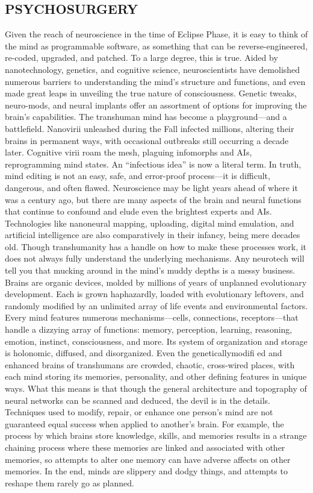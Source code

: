 \subsection{PSYCHOSURGERY}
Given the reach of neuroscience in the time of
Eclipse Phase, it is easy to think of the mind as
programmable software, as something that can be
reverse-engineered, re-coded, upgraded, and patched.
To a large degree, this is true. Aided by nanotechnology,
genetics, and cognitive science, neuroscientists
have demolished numerous barriers to understanding
the mind’s structure and functions, and even
made great leaps in unveiling the true nature of
consciousness. Genetic tweaks, neuro-mods, and
neural implants offer an assortment of options for
improving the brain’s capabilities. The transhuman
mind has become a playground—and a battlefield.
Nanovirii unleashed during the Fall infected millions,
altering their brains in permanent ways, with
occasional outbreaks still occurring a decade later.
Cognitive virii roam the mesh, plaguing infomorphs
and AIs, reprogramming mind states. An “infectious
idea” is now a literal term.
In truth, mind editing is not an easy, safe, and
error-proof process—it is difficult, dangerous, and
often flawed. Neuroscience may be light years
ahead of where it was a century ago, but there are
many aspects of the brain and neural functions
that continue to confound and elude even the
brightest experts and AIs. Technologies like nanoneural
mapping, uploading, digital mind emulation,
and artificial intelligence are also comparatively
in their infancy, being mere decades old. Though
transhumanity has a handle on how to make these
processes work, it does not always fully understand
the underlying mechanisms.
Any neurotech will tell you that mucking around
in the mind’s muddy depths is a messy business.
Brains are organic devices, molded by millions of
years of unplanned evolutionary development. Each
is grown haphazardly, loaded with evolutionary
leftovers, and randomly modified by an unlimited
array of life events and environmental factors. Every
mind features numerous mechanisms—cells, connections,
receptors—that handle a dizzying array
of functions: memory, perception, learning, reasoning,
emotion, instinct, consciousness, and more. Its
system of organization and storage is holonomic,
diffused, and disorganized. Even the geneticallymodifi
ed and enhanced brains of transhumans are
crowded, chaotic, cross-wired places, with each
mind storing its memories, personality, and other
defining features in unique ways.
What this means is that though the general architecture
and topography of neural networks can
be scanned and deduced, the devil is in the details.
Techniques used to modify, repair, or enhance one
person’s mind are not guaranteed equal success
when applied to another’s brain. For example, the
process by which brains store knowledge, skills, and
memories results in a strange chaining process where
these memories are linked and associated with other
memories, so attempts to alter one memory can
have adverse affects on other memories. In the end,
minds are slippery and dodgy things, and attempts
to reshape them rarely go as planned.

